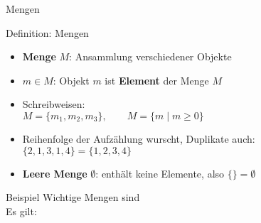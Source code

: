\begin{frame}{Mengen}
	\pause %
	\begin{block}{Definition: Mengen} \vspace{-.5\baselineskip}
		\begin{itemize}
			\item \textbf{Menge} $M$: Ansammlung verschiedener Objekte
			\item $m \in M$: Objekt $m$ ist \textbf{Element} der Menge $M$
			\item Schreibweisen: \\
			$M = \{m_1, m_2, m_3 \}, \qquad M = \{m \mid m \geq 0\}$
			\item Reihenfolge der Aufzählung wurscht, Duplikate auch: \\
			$\{2,1,3,1,4\} = \{1,2,3,4\}$
			\item \textbf{Leere Menge} $\emptyset$: enthält keine Elemente, \quad also $\{\} = \emptyset$
		\end{itemize}
	\end{block}
	\pause
	
	\begin{block}{Beispiel}
		Wichtige Mengen sind \\ 
		Es gilt:\\ 
	\end{block}
	
\end{frame}

